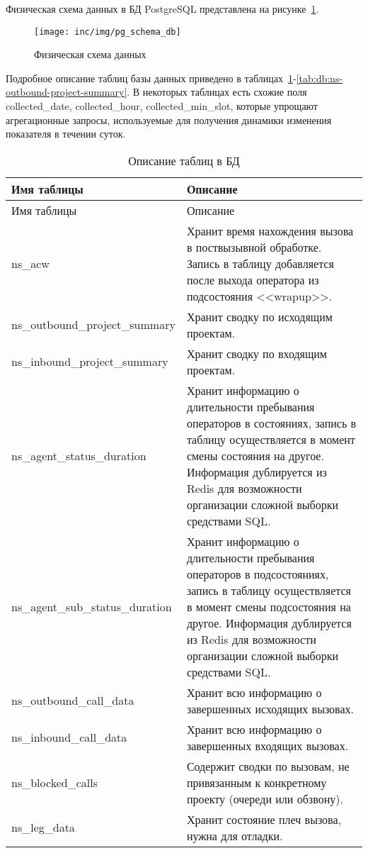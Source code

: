 Физическая схема данных в БД PostgreSQL представлена на рисунке~\ref{pic:schema-db}. %

\begin{figure}[!ht]
    \centering
    \texttt{[image: inc/img/pg\_schema\_db]}
    \caption{Физическая схема данных}
    \label{pic:schema-db}
\end{figure}

Подробное описание таблиц базы данных приведено в таблицах~\ref{tab:db:summary}-\ref{tab:db:ns-outbound-project-summary}.
В некоторых таблицах есть схожие поля collected\_date, collected\_hour, collected\_min\_slot,
которые упрощают агрегационные запросы, используемые для получения динамики изменения показателя в течении суток.

\begin{small}
    \begin{longtable}{|p{}|p{}|}
        \caption{Описание таблиц в БД}
        \label{tab:db:summary}
        \\ \hline
        Имя таблицы & Описание \\
        \hline \endfirsthead
        \hline
        Имя таблицы & Описание \\
        \hline
        \endhead
        \hline \endlastfoot
        ns\_acw & Хранит время нахождения вызова в поствызывной обработке.
        Запись в таблицу добавляется после выхода оператора из подсостояния <<wrapup>>. \\
        \hline
        ns\_outbound\_project\_summary & Хранит сводку по исходящим проектам. \\
        \hline
        ns\_inbound\_project\_summary & Хранит сводку по входящим проектам. \\
        \hline
        ns\_agent\_status\_duration &
        Хранит информацию о длительности пребывания операторов в состояниях,
        запись в таблицу осуществляется в момент смены состояния на другое.
        Информация дублируется из Redis для возможности организации сложной выборки средствами SQL\@. \\
        \hline
        ns\_agent\_sub\_status\_duration &
        Хранит информацию о длительности пребывания операторов в подсостояниях,
        запись в таблицу осуществляется в момент смены подсостояния на другое.
        Информация дублируется из Redis для возможности организации сложной выборки средствами SQL\@.  \\
        \hline
        ns\_outbound\_call\_data &
        Хранит всю информацию о завершенных исходящих вызовах. \\
        \hline
        ns\_inbound\_call\_data &
        Хранит всю информацию о завершенных входящих вызовах. \\
        \hline
        ns\_blocked\_calls &
        Содержит сводки по вызовам, не привязанным к конкретному проекту (очереди или обзвону). \\
        \hline
        ns\_leg\_data &
        Хранит состояние плеч вызова, нужна для отладки. \\
    \end{longtable}
\end{small}

